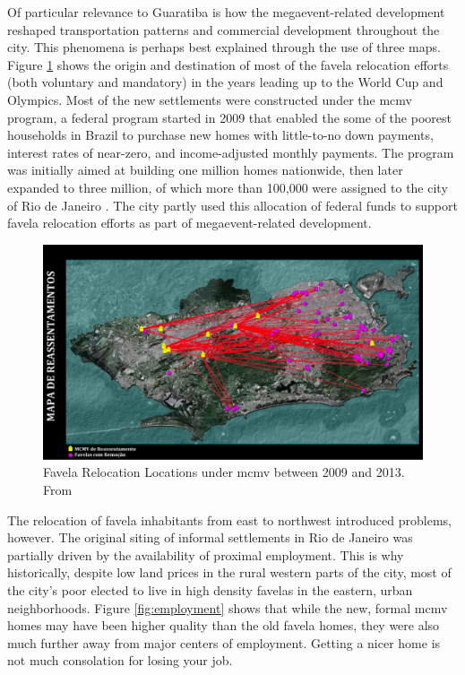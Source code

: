Of particular relevance to Guaratiba is how the megaevent-related development reshaped transportation patterns and commercial development throughout the city. This phenomena is perhaps best explained through the use of three maps. Figure \ref{fig:relocation} shows the origin and destination of most of the favela relocation efforts (both voluntary and mandatory) in the years leading up to the World Cup and Olympics. Most of the new settlements were constructed under the \ac{mcmv} program, a federal program started in 2009 that enabled the some of the poorest households in Brazil to purchase new homes with little-to-no down payments, interest rates of near-zero, and income-adjusted monthly payments. The program was initially aimed at building one million homes nationwide, then later expanded to three million, of which more than 100,000 were assigned to the city of Rio de Janeiro \cite{nadalMinhaCasaMinha2018}. The city partly used this allocation of federal funds to support favela relocation efforts as part of megaevent-related development.

\begin{figure}[!htb]
	\centering
	\includegraphics[scale=0.3]{Figures/chap4/Relocation.png}
	\caption[Favela Relocation Locations under MCMV between 2009 and 2013]{Favela Relocation Locations under \ac{mcmv} between 2009 and 2013. From \cite{faulhaberRioMaravilhaProjetos2012}}
	\label{fig:relocation}
\end{figure}

The relocation of favela inhabitants from east to northwest introduced problems, however. The original siting of informal settlements in Rio de Janeiro was partially driven by the availability of proximal employment. This is why historically, despite low land prices in the rural western parts of the city, most of the city's poor elected to live in high density favelas in the eastern, urban neighborhoods. Figure \ref{fig:employment} shows that while the new, formal \ac{mcmv} homes may have been higher quality than the old favela homes, they were also much further away from major centers of employment. Getting a nicer home is not much consolation for losing your job. 

